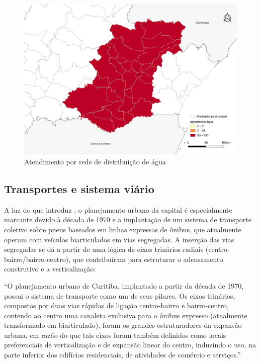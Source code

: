 	\begin{landscape}
		\begin{figure}
			\centering
			\caption{Atendimento por rede de distribuição de água}
			\label{fig:saneamentorede}
			\includegraphics[width=0.80\linewidth]{img/snis_C}
		\end{figure}
	\end{landscape}

	\subsection{Transportes e sistema viário}
	
	A luz do que introduz , o planejamento urbano da capital é especialmente marcante devido à década de 1970 e a implantação de um sistema de transporte coletivo sobre pneus baseados em linhas expressas de ônibus, que atualmente operam com veículos biarticulados em vias segregadas. A inserção das vias segregadas se dá a partir de uma lógica de eixos trinários radiais (centro-bairro/bairro-centro), que contribuíram para estruturar o adensamento construtivo e a verticalização:
	
	\begin{citacao}
		``O planejamento urbano de Curitiba, implantado a partir da década de 1970, possui o sistema de transporte como um de seus pilares. Os eixos trinários, compostos por duas vias rápidas de ligação centro-bairro e bairro-centro, contendo ao centro uma canaleta exclusiva para o ônibus expresso (atualmente transformado em biarticulado), foram os grandes estruturadores da expansão urbana, em razão do que tais eixos foram também definidos como locais preferenciais de verticalização e de expansão linear do centro, induzindo o uso, na parte inferior dos edifícios residenciais, de atividades de comércio e serviços.''
	\end{citacao}

